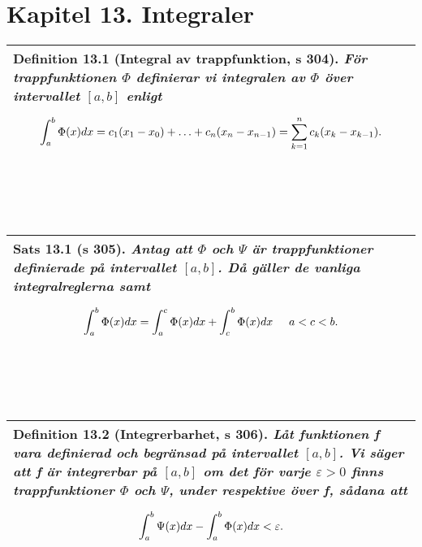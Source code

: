 \documentclass[a4paper]{article}
\begin{document}
\section*{Kapitel 13. Integraler}
\begin{tabular}{|L{11.5cm}|} \hline
\textbf{Definition 13.1} (Integral av trappfunktion, s 304). 
\textit{För trappfunktionen $\Phi$ definierar vi \textbf{integralen} av $\Phi$ över intervallet $[a,b]$ enligt}
\begin{equation*}
\renewcommand{\arraystretch}{2.5}
\begin{array}{>{\displaystyle}c}
\int_{a}^{b}\Phi(x)dx=c_1(x_1-x_0)+\ldots+c_n(x_n-x_{n-1})
= \sum_{k=1}^{n}c_k(x_k-x_{k-1}).
\end{array}
\end{equation*}
\\\hline
\end{tabular}
\\\\\\
\begin{tabular}{|L{11.5cm}|} \hline
\textbf{Sats 13.1} (s 305). 
\textit{Antag att $\Phi$ och $\Psi$ är trappfunktioner definierade på intervallet $[a,b]$. Då gäller de vanliga integralreglerna samt}
\begin{equation*}
\renewcommand{\arraystretch}{2.5}
\begin{array}{>{\displaystyle}c}
\int_{a}^{b}\Phi(x)dx=\int_{a}^{c}\Phi(x)dx+\int_{c}^{b}\Phi(x)dx \hspace{0.5cm} a<c<b.
\end{array}
\end{equation*}
\\\hline
\end{tabular}
\\\\\\
\begin{tabular}{|L{11.5cm}|} \hline
\textbf{Definition 13.2} (Integrerbarhet, s 306).
\textit{Låt funktionen f vara definierad och begränsad på intervallet $[a,b]$. Vi säger att f är \textbf{integrerbar} på $[a,b]$ om det för varje $\varepsilon > 0$ finns trappfunktioner $\Phi$ och $\Psi$, under respektive över f, sådana att}
\begin{equation*}
\renewcommand{\arraystretch}{2.5}
\begin{array}{>{\displaystyle}c}
\int_{a}^{b}\Psi(x)dx-\int_{a}^{b}\Phi(x)dx < \varepsilon.
\end{array}
\end{equation*}
\\\hline
\end{tabular}
\end{document}
